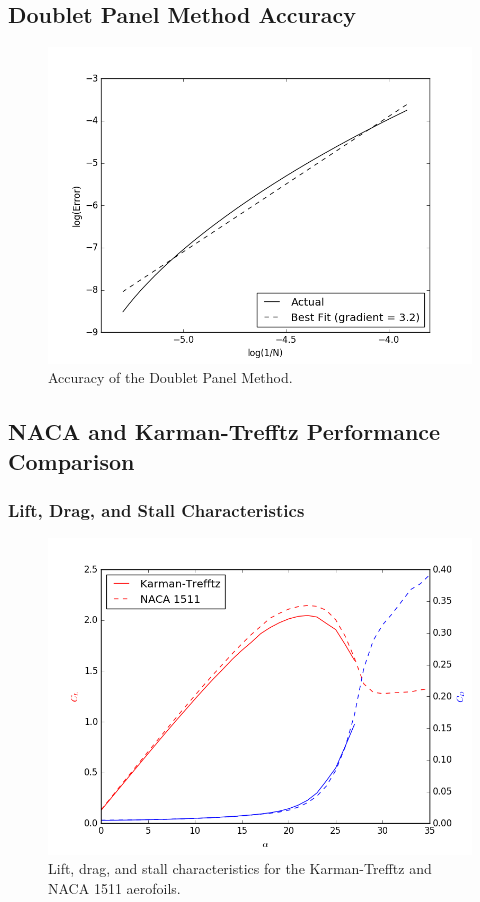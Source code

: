 \documentclass[10pt,a4paper]{article}
\begin{document}
\subsection{Doublet Panel Method Accuracy}
\begin{figure}[!htb]
\centering
\includegraphics[scale=0.75]{Figures/accuracy.png}
\caption{Accuracy of the Doublet Panel Method.}
\label{fig:accuracy}
\end{figure}
\subsection{NACA and Karman-Trefftz Performance Comparison}
\subsubsection{Lift, Drag, and Stall Characteristics}
\begin{figure}[!htb]
\centering
\includegraphics[scale=0.75]{Figures/polar_characteristics.png}
\caption{Lift, drag, and stall characteristics for the Karman-Trefftz and NACA 1511 aerofoils.}
\label{fig:characteristics}
\end{figure}
\end{document}

